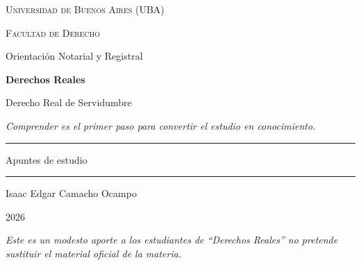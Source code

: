 \documentclass[12pt,oneside]{book}
\newcommand{\universidad}{Universidad de Buenos Aires (UBA)}
\newcommand{\facultad}{Facultad de Derecho}
\newcommand{\carrera}{Orientación Notarial y Registral}
\newcommand{\materia}{Derechos Reales}
\newcommand{\titulo}{Derecho Real de Servidumbre}
\newcommand{\autor}{Isaac Edgar Camacho Ocampo}
\newcommand{\anio}{2026}
\begin{document}
\begin{titlepage}

\thispagestyle{empty}

\begin{center}

\vspace*{1cm}

{\large \textsc{\universidad}}

\vspace{0.2cm}

{\large \textsc{\facultad}}

\vspace{0.2cm}

{\large \carrera}

\vspace{3cm}

{\Huge \textbf{\materia}}

\vspace{1cm}

{\LARGE \titulo}

\vspace{0.8cm}

{\small \textit{Comprender es el primer paso para convertir el estudio en conocimiento.}}

\vspace{1.2cm}

\rule{0.70\textwidth}{0.5pt}

\vspace{0.5cm}

{\large Apuntes de estudio}

\vspace{0.5cm}

\rule{0.70\textwidth}{0.5pt}

\vfill

{\large \autor}

\vspace{0.3cm}

{\large \anio}

\end{center}

\vfill

\begin{flushleft}
\textit{Este es un modesto aporte a los estudiantes de ``Derechos Reales'' no pretende sustituir el material oficial de la materia.}
\end{flushleft}

\end{titlepage}
\end{document}
